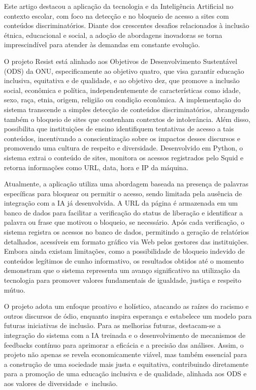 Este artigo destacou a aplicação da tecnologia e da Inteligência Artificial no contexto escolar, com foco na detecção e no bloqueio de acesso a sites com conteúdos discriminatórios. Diante dos crescentes desafios relacionados à inclusão étnica, educacional e social, a adoção de abordagens inovadoras se torna imprescindível para atender às demandas em constante evolução. 

O projeto Resist está alinhado aos Objetivos de Desenvolvimento Sustentável (ODS) da ONU, especificamente ao objetivo quatro, que visa garantir educação inclusiva, equitativa e de qualidade, e ao objetivo dez, que promove a inclusão social, econômica e política, independentemente de características como idade, sexo, raça, etnia, origem, religião ou condição econômica. A implementação do sistema transcende a simples detecção de conteúdos discriminatórios, abrangendo também o bloqueio de sites que contenham contextos de intolerância. Além disso, possibilita que instituições de ensino identifiquem tentativas de acesso a tais conteúdos, incentivando a conscientização sobre os impactos desses discursos e promovendo uma cultura de respeito e diversidade. Desenvolvido em Python, o sistema extrai o conteúdo de sites, monitora os acessos registrados pelo Squid e retorna informações como URL, data, hora e IP da máquina. 

Atualmente, a aplicação utiliza uma abordagem baseada na presença de palavras específicas para bloquear ou permitir o acesso, sendo limitada pela ausência de integração com a IA já desenvolvida. A URL da página é armazenada em um banco de dados para facilitar a verificação do status de liberação e identificar a palavra ou frase que motivou o bloqueio, se necessário. Após cada verificação, o sistema registra os acessos no banco de dados, permitindo a geração de relatórios detalhados, acessíveis em formato gráfico via Web pelos gestores das instituições. Embora ainda existam limitações, como a possibilidade de bloqueio indevido de conteúdos legítimos de cunho informativo, os resultados obtidos até o momento demonstram que o sistema representa um avanço significativo na utilização da tecnologia para promover valores fundamentais de igualdade, justiça e respeito mútuo. 

O projeto adota um enfoque proativo e holístico, atacando as raízes do racismo e outros discursos de ódio, enquanto inspira esperança e estabelece um modelo para futuras iniciativas de inclusão. Para as melhorias futuras, destacam-se a integração do sistema com a IA treinada e o desenvolvimento de mecanismos de feedbacks contínuo para aprimorar a eficácia e a precisão das análises. Assim, o projeto não apenas se revela economicamente viável, mas também essencial para a construção de uma sociedade mais justa e equitativa, contribuindo diretamente para a promoção de uma educação inclusiva e de qualidade, alinhada aos ODS e aos valores de diversidade e inclusão.
